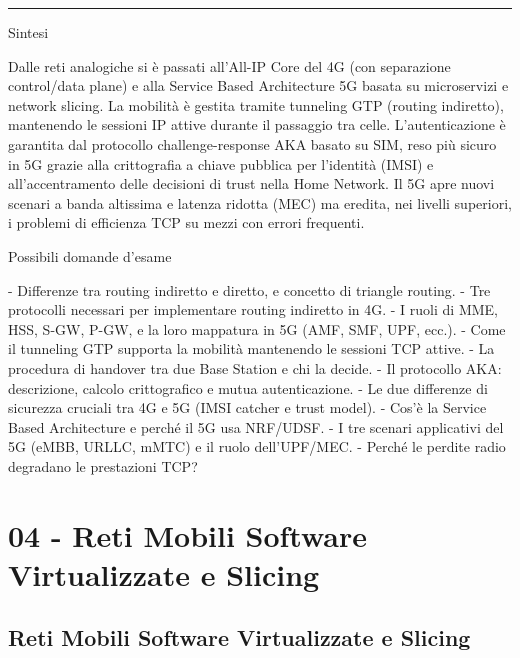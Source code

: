 \documentclass[
  italian,
  openany]{book}
\begin{document}
\begin{center}\rule{0.5\linewidth}{0.5pt}\end{center}

\begin{calloutnote}{Sintesi}

Dalle reti analogiche si è passati all'All-IP Core del 4G (con
separazione control/data plane) e alla Service Based Architecture 5G
basata su microservizi e network slicing. La mobilità è gestita tramite
tunneling GTP (routing indiretto), mantenendo le sessioni IP attive
durante il passaggio tra celle. L'autenticazione è garantita dal
protocollo challenge-response AKA basato su SIM, reso più sicuro in 5G
grazie alla crittografia a chiave pubblica per l'identità (IMSI) e
all'accentramento delle decisioni di trust nella Home Network. Il 5G
apre nuovi scenari a banda altissima e latenza ridotta (MEC) ma eredita,
nei livelli superiori, i problemi di efficienza TCP su mezzi con errori
frequenti.

\end{calloutnote}

\begin{calloutquestion}{Possibili domande d’esame}

- Differenze tra routing indiretto e diretto, e concetto di triangle
routing. - Tre protocolli necessari per implementare routing indiretto
in 4G. - I ruoli di MME, HSS, S-GW, P-GW, e la loro mappatura in 5G
(AMF, SMF, UPF, ecc.). - Come il tunneling GTP supporta la mobilità
mantenendo le sessioni TCP attive. - La procedura di handover tra due
Base Station e chi la decide. - Il protocollo AKA: descrizione, calcolo
crittografico e mutua autenticazione. - Le due differenze di sicurezza
cruciali tra 4G e 5G (IMSI catcher e trust model). - Cos'è la Service
Based Architecture e perché il 5G usa NRF/UDSF. - I tre scenari
applicativi del 5G (eMBB, URLLC, mMTC) e il ruolo dell'UPF/MEC. - Perché
le perdite radio degradano le prestazioni TCP?

\end{calloutquestion}

\newpage

\chapter{04 - Reti Mobili Software Virtualizzate e
Slicing}\label{reti-mobili-software-virtualizzate-e-slicing}

\section{Reti Mobili Software Virtualizzate e
Slicing}\label{reti-mobili-software-virtualizzate-e-slicing-1}
\end{document}
